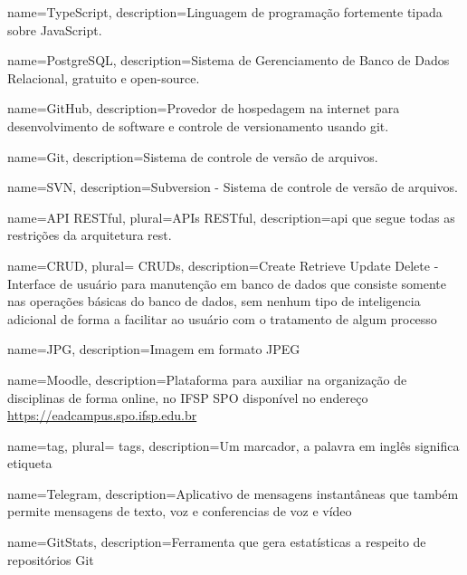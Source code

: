  {
	name=TypeScript,
	description={Linguagem de programação fortemente tipada sobre JavaScript.}
}

 {
	name=PostgreSQL,
	description={Sistema de Gerenciamento de Banco de Dados Relacional, gratuito e open-source.}
}

 {
	name=GitHub,
	description={Provedor de hospedagem na internet para desenvolvimento de software e controle de versionamento usando \gls{git}.}
}

 {
	name=Git,
	description={Sistema de controle de versão de arquivos.}
}

 {
	name=SVN,
	description={Subversion - Sistema de controle de versão de arquivos.}
}

 {
	name=API RESTful,
	plural=APIs RESTful,
	description={\ac{api} que segue todas as restrições da arquitetura \ac{rest}.}
}


 



 {
    name=CRUD,
    plural= {CRUDs},
    description={Create Retrieve Update Delete - Interface de usuário para manutenção em banco de dados que consiste somente nas operações básicas do banco de dados, sem nenhum tipo de inteligencia adicional de forma a facilitar ao usuário com o tratamento de algum processo}
}

 {
    name=JPG,
    description={Imagem em formato JPEG}
}

 {
    name=Moodle,
    description={Plataforma para auxiliar na organização de disciplinas de forma online, no IFSP SPO disponível no endereço \url{https://eadcampus.spo.ifsp.edu.br}}
}


 {
    name=tag,
    plural= {tags},
    description={Um marcador, a palavra em inglês significa etiqueta}
}
                
 {
    name=Telegram,
    description={Aplicativo de mensagens instantâneas que também permite mensagens de texto, voz e conferencias de voz e vídeo}
}

 {
	name=GitStats,
	description={Ferramenta que gera estatísticas a respeito de repositórios Git}
}
